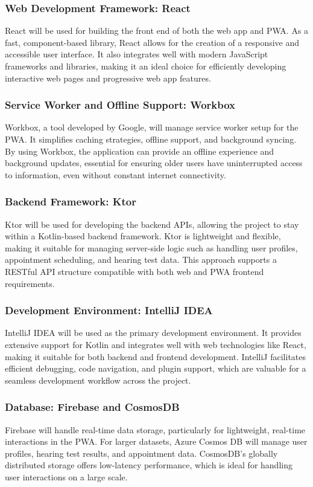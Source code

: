 \documentclass{article}
\begin{document}
\subsubsection{Web Development Framework: React}
React will be used for building the front end of both the web app and PWA. As a fast, component-based library, React allows for the creation of a responsive and accessible user interface. It also integrates well with modern JavaScript frameworks and libraries, making it an ideal choice for efficiently developing interactive web pages and progressive web app features.

\subsubsection{Service Worker and Offline Support: Workbox}
Workbox, a tool developed by Google, will manage service worker setup for the PWA. It simplifies caching strategies, offline support, and background syncing. By using Workbox, the application can provide an offline experience and background updates, essential for ensuring older users have uninterrupted access to information, even without constant internet connectivity.

\subsubsection{Backend Framework: Ktor}
Ktor will be used for developing the backend APIs, allowing the project to stay within a Kotlin-based backend framework. Ktor is lightweight and flexible, making it suitable for managing server-side logic such as handling user profiles, appointment scheduling, and hearing test data. This approach supports a RESTful API structure compatible with both web and PWA frontend requirements.

\subsubsection{Development Environment: IntelliJ IDEA}
IntelliJ IDEA will be used as the primary development environment. It provides extensive support for Kotlin and integrates well with web technologies like React, making it suitable for both backend and frontend development. IntelliJ facilitates efficient debugging, code navigation, and plugin support, which are valuable for a seamless development workflow across the project.

\subsubsection{Database: Firebase and CosmosDB}
Firebase will handle real-time data storage, particularly for lightweight, real-time interactions in the PWA. For larger datasets, Azure Cosmos DB will manage user profiles, hearing test results, and appointment data. CosmosDB’s globally distributed storage offers low-latency performance, which is ideal for handling user interactions on a large scale.
\end{document}
